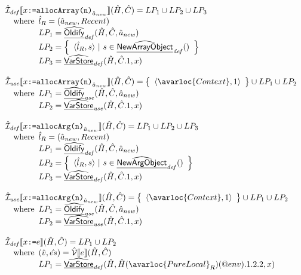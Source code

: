 \[
\begin{array}{l}
  \aI_{\it def}\lbr x\TT{:=}\TT{allocArray(n)}_{\hat{a}_{new}}\rbr(\hat{H},\hat{C})
  = LP_1 \cup LP_2 \cup LP_3\\
  \quad\wherec{
    \hat{l}_R = (\hat{a}_{new},Recent)\\
    LP_1 = \ahf{Oldify}_{\it def}(\hat{H}, \hat{C}, \hat{a}_{new}) \\
    LP_2 = \set{\langle \hat{l}_R, s \rangle ~|~ s \in \ahf{NewArrayObject}_{\it def}() } \\
    LP_3 = \ahf{VarStore}_{\it def}(\hat{H}, \hat{C}.1, x)\\
  }
  \\\\
  \aI_{\it use}\lbr x\TT{:=}\TT{allocArray(n)}_{\hat{a}_{new}}\rbr(\hat{H},\hat{C})
  = \set{\langle \avarloc{Context}, 1\rangle} \cup LP_1 \cup LP_2\\
  \quad\wherec{
    LP_1 = \ahf{Oldify}_{\it use}(\hat{H}, \hat{C}, \hat{a}_{new}) \\
    LP_2 = \ahf{VarStore}_{\it use}(\hat{H}, \hat{C}.1, x)
  }
  \\\\
  \aI_{\it def}\lbr x\TT{:=}\TT{allocArg(n)}_{\hat{a}_{new}}\rbr(\hat{H},\hat{C})
  = LP_1 \cup LP_2 \cup LP_3 \\
  \quad\wherec{
    \hat{l}_R = (\hat{a}_{new},Recent)\\
    LP_1 = \ahf{Oldify}_{\it def}(\hat{H}, \hat{C}, \hat{a}_{new}) \\
    LP_2 = \set{\langle \hat{l}_R, s \rangle ~|~ s \in \ahf{NewArgObject}_{\it def}() } \\
    LP_3 = \ahf{VarStore}_{\it def}(\hat{H}, \hat{C}.1, x)
  }
  \\\\
  \aI_{\it use}\lbr x\TT{:=}\TT{allocArg(n)}_{\hat{a}_{new}}\rbr(\hat{H},\hat{C})
  = \set{\langle \avarloc{Context}, 1\rangle} \cup LP_1 \cup LP_2\\
  \quad\wherec{
    LP_1 = \ahf{Oldify}_{\it use}(\hat{H}, \hat{C}, \hat{a}_{new}) \\
    LP_2 = \ahf{VarStore}_{\it use}(\hat{H}, \hat{C}.1, x)
  }
  \\\\
  \aI_{\it def}\lbr x\TT{:=}e\rbr(\hat{H},\hat{C})
  = LP_1 \cup LP_2\\
  \quad\wherec{
    (\hat{v},\hat{es}) = \aV\lbr e\rbr(\hat{H},\hat{C})\\
    LP_1 = \ahf{VarStore}_{\it def}(\hat{H}, \hat{H}(\avarloc{PureLocal}_R)(\varprop{env}).1.2.2, x)\\
}
\end{array}\]
